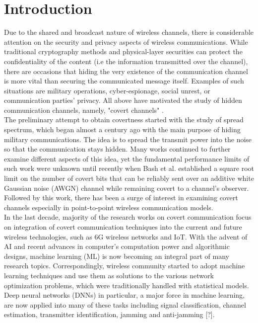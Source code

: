 \section{Introduction}
\label{s:intro}

Due to the shared and broadcast nature of wireless channels, there is considerable attention on the security and privacy aspects of wireless communications. While traditional cryptography methods and physical-layer securities can protect the confidentiality of the content (i.e the information transmitted over the channel), there are occasions that hiding the very existence of the communication channel is more vital than securing the communicated message itself. Examples of such situations are military operations, cyber-espionage, social unrest, or communication parties' privacy. All above have motivated the study of hidden communication channels, namely, "covert channels" \cite{lampson1973note}.\\
The preliminary attempt to obtain covertness started with the study of spread spectrum, which began almost a century ago with the main purpose of hiding military communications. The idea is to spread the transmit power into the noise so that the communication stays hidden. Many works continued to further examine different aspects of this idea, yet the fundamental performance limits of such work were unknown until recently when Bash et al. \cite{bash2012square} established a square root limit on the number of covert bits that can be reliably sent over an additive white Gaussian noise (AWGN) channel while remaining covert to a channel's observer. Followed by this work, there has been a surge of interest in examining covert channels \cite{sobers2017covert,soltani2018covert} especially in point-to-point wireless communication models.\\
In the last decade, majority of the research works on covert communication focus on integration of covert communication techniques into the current and future wireless technologies, such as 6G wireless networks and IoT. With the advent of AI and recent advances in computer's computation power and algorithmic designs, machine learning (ML) is now becoming an integral part of many research topics. Correspondingly, wireless community started to adopt machine learning techniques and use them as solutions to the various network optimization problems, which were traditionally handled with statistical models. Deep neural networks (DNNs) in particular, a major force in machine learning, are now applied into many of these tasks including signal classification, channel estimation, transmitter identification, jamming and anti-jamming [?].\\
